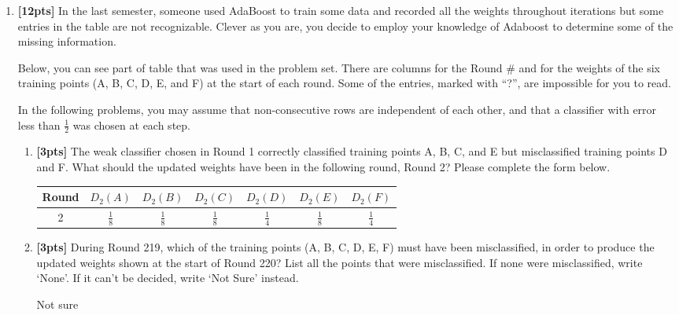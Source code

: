 \begin{enumerate}
    \item \textbf{[12pts]} In the last semester, someone used AdaBoost to train some data and recorded all the weights throughout iterations but some entries in the table are not recognizable. Clever as you are, you decide to employ your knowledge of Adaboost to determine some of the missing information.
    
    Below, you can see part of table that was used in the problem set. There are columns for the Round \# and for the weights of the six training points (A, B, C, D, E, and F) at the start of each round. Some of the entries, marked with “?”, are impossible for you to read.
    

    

In the following problems, you may assume that non-consecutive rows are independent of each other, and that a classifier with error less than $\frac{1}{2}$ was chosen at each step.

   \begin{enumerate}
        \item \textbf{[3pts]}  The weak classifier chosen in Round 1 correctly classified training points A, B, C, and E but misclassified training points D and F. What should the updated weights have been in the following round, Round 2? Please complete the form below.
   
\begin{table}[h!]
\begin{center}
\begin{tabular}{ |c|c|c|c|c|c|c| } 
 \hline
 Round & $D_2(A)$ & $D_2(B)$ & $D_2(C)$ & $D_2(D)$ & $D_2(E)$ & $D_2(F)$\\ [4pt]
  \hline
  \hline
 2 & $\frac{1}{8}$  & $\frac{1}{8}$ & $\frac{1}{8}$  &  $\frac{1}{4}$ &  $\frac{1}{8}$ &  $\frac{1}{4}$ \\ [4pt]
\hline
\end{tabular}
\end{center}
\end{table}  

    \item \textbf{[3pts]} During Round 219, which of the training points (A, B, C, D, E, F) must have been misclassified, in order to produce the updated weights shown at the start of Round 220? List all the points that were misclassified. If none were misclassified, write `None'. If it can't be decided, write `Not Sure' instead.
    
    \begin{tcolorbox}[fit,height=1cm, width=6cm, blank, borderline={1pt}{-2pt},nobeforeafter]
    \begin{center}\huge{Not sure} \end{center}
    \end{tcolorbox}\\


\end{enumerate}
\end{enumerate}

